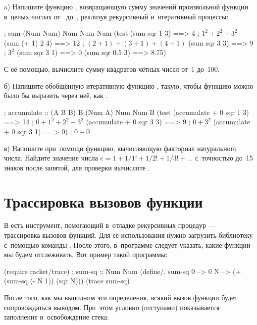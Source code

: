 \begin{Assignment}

a) Напишите функцию , возвращающую сумму значений произвольной функции  в~целых числах от~ до~, реализуя рекурсивный и~итеративный процессы:
\begin{Specification}
  ; sum (Num \arrow Num) Num Num \arrow Num
  (test 
    (sum sqr 1 3)   ==> 4    ; $1^2 + 2^2 + 3^2$
    (sum (+ 1) 2 4) ==> 12   ; $(2+1) + (3+1) + (4+1)$
    (sum sqr 3 3)   ==> 9    ; $3^2$
    (sum sqr 3 1)   ==> 0
    (sum sqr 0.5 3) ==> 8.75)
\end{Specification}
С её помощью, вычислите сумму квадратов чётных чисел от~1 до~100.

\smallskip
б) \label{accumulate}Напишите обобщённую итеративную функцию , такую, чтобы функцию  можно было бы выразить через неё, как . 
\begin{Specification}
  ; accumulate :: (A B \arrow B) B (Num \arrow A) Num Num \arrow B
  (test         
    (accumulate + 0 sqr 1 3) ==> 14  ; $0 + 1^2 +2^2 + 3^2$
    (accumulate + 0 sqr 3 3) ==> 9   ; $0 + 3^2$
    (accumulate + 0 sqr 3 1) ==> 0)  ; $0 + 0$
\end{Specification}
\newpage
в) \label{ass:exp} Напишите при~помощи  функцию, вычисляющую факториал натурального числа. Найдите значение числа $e = 1 + 1/1! + 1/2! + 1/3! +...$ с~точностью до~15 знаков после запятой, для проверки вычислите  .

\end{Assignment}

\section{Трассировка вызовов функции}%
В \Scheme есть инструмент, помогающий в~отладке рекурсивных процедур~--- трассировка вызовов функций. Для её использования нужно загрузить библиотеку  с~помощью команды . После этого, в~программе следует указать, какие функции мы будем отслеживать. Вот пример такой программы:

\begin{Definition}[emph=N]
(require racket/trace)%
; sum-sq :: Num \arrow Num
(define/. sum-sq
  0 --> 0
  N --> (+ (sum-sq (- N 1)) (sqr N)))%
(trace sum-sq)
\end{Definition}

После того, как мы выполним эти определения, всякий вызов функции  будет сопровождаться выводом. При~этом условно (отступами) показывается заполнение и~освобождение стека:

